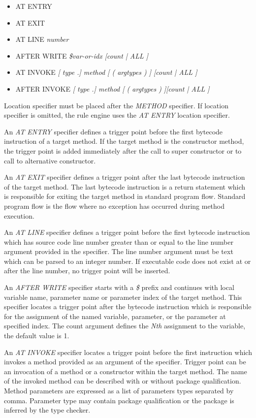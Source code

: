 \documentclass[12pt,oneside]{fithesis2}
\begin{document}
\begin{itemize}
\item	AT ENTRY
\item	AT EXIT
\item	AT LINE \textit{number}
\item	AFTER WRITE \textit{\$var-or-idx [count | ALL ]}
\item	AT INVOKE \textit{[ type .] method [ ( argtypes ) ] [count | ALL ]}
\item	AFTER INVOKE \textit{[ type .] method [ ( argtypes ) ][count | ALL ]}
\end{itemize}

Location specifier must be placed after the \textit{METHOD} specifier. If location specifier is omitted, the rule engine uses the \textit{AT ENTRY} location specifier.

An \textit{AT ENTRY} specifier defines a trigger point before the first bytecode instruction of a target method. If the target method is the constructor method, the trigger point is added immediately after the call to super constructor or to call to alternative constructor.

An \textit{AT EXIT} specifier defines a trigger point after the last bytecode instruction of the target method. The last bytecode instruction is a return statement which is responsible for exiting the target method in standard program flow. Standard program flow is the flow where no exception has occurred during method execution.

An \textit{AT LINE} specifier defines a trigger point before the first bytecode instruction which has source code line number greater than or equal to the line number argument provided in the specifier. The line number argument must be text which can be parsed to an integer number. If executable code does not exist at or after the line number, no trigger point will be inserted.

An \textit{AFTER WRITE} specifier starts with a \textit{\$} prefix and continues with local variable name, parameter name or parameter index of the target method. This specifier locates a trigger point after the bytecode instruction which is responsible for the assignment of the named variable, parameter, or the parameter at specified index. The count argument defines the \textit{Nth} assignment to the variable, the default value is 1.

An \textit{AT INVOKE} specifier locates a trigger point before the first instruction which invokes a method provided as an argument of the specifier. Trigger point can be an invocation of a method or a constructor within the target method. The name of the invoked method can be described with or without package qualification. Method parameters are expressed as a list of parameters types separated by comma. Parameter type may contain package qualification or the package is inferred by the type checker.
\end{document}
